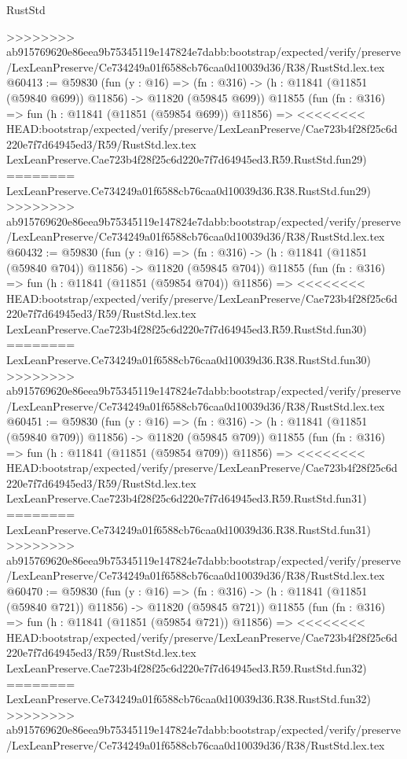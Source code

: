\begin{lexlean}{RustStd}
\begin{coremodule}
{\begin{coremodule}
{{{{{{{{{{{{{{{{{{{{{{{{{{{{{{{{{{{{{{{{{{{{{{{{{{>>>>>>>> ab915769620e86eea9b75345119e147824e7dabb:bootstrap/expected/verify/preserve/LexLeanPreserve/Ce734249a01f6588cb76caa0d10039d36/R38/RustStd.lex.tex
@60413 := @59830
    (fun (y : @16) =>
    (fn : @316) -> (h : @11841 (@11851 (@59840 @699)) @11856) -> @11820 (@59845 @699))
    @11855
    (fun (fn : @316) =>
    fun (h : @11841 (@11851 (@59854 @699)) @11856) =>
<<<<<<<< HEAD:bootstrap/expected/verify/preserve/LexLeanPreserve/Cae723b4f28f25c6d220e7f7d64945ed3/R59/RustStd.lex.tex
    LexLeanPreserve.Cae723b4f28f25c6d220e7f7d64945ed3.R59.RustStd.fun29)
========
    LexLeanPreserve.Ce734249a01f6588cb76caa0d10039d36.R38.RustStd.fun29)
>>>>>>>> ab915769620e86eea9b75345119e147824e7dabb:bootstrap/expected/verify/preserve/LexLeanPreserve/Ce734249a01f6588cb76caa0d10039d36/R38/RustStd.lex.tex
@60432 := @59830
    (fun (y : @16) =>
    (fn : @316) -> (h : @11841 (@11851 (@59840 @704)) @11856) -> @11820 (@59845 @704))
    @11855
    (fun (fn : @316) =>
    fun (h : @11841 (@11851 (@59854 @704)) @11856) =>
<<<<<<<< HEAD:bootstrap/expected/verify/preserve/LexLeanPreserve/Cae723b4f28f25c6d220e7f7d64945ed3/R59/RustStd.lex.tex
    LexLeanPreserve.Cae723b4f28f25c6d220e7f7d64945ed3.R59.RustStd.fun30)
========
    LexLeanPreserve.Ce734249a01f6588cb76caa0d10039d36.R38.RustStd.fun30)
>>>>>>>> ab915769620e86eea9b75345119e147824e7dabb:bootstrap/expected/verify/preserve/LexLeanPreserve/Ce734249a01f6588cb76caa0d10039d36/R38/RustStd.lex.tex
@60451 := @59830
    (fun (y : @16) =>
    (fn : @316) -> (h : @11841 (@11851 (@59840 @709)) @11856) -> @11820 (@59845 @709))
    @11855
    (fun (fn : @316) =>
    fun (h : @11841 (@11851 (@59854 @709)) @11856) =>
<<<<<<<< HEAD:bootstrap/expected/verify/preserve/LexLeanPreserve/Cae723b4f28f25c6d220e7f7d64945ed3/R59/RustStd.lex.tex
    LexLeanPreserve.Cae723b4f28f25c6d220e7f7d64945ed3.R59.RustStd.fun31)
========
    LexLeanPreserve.Ce734249a01f6588cb76caa0d10039d36.R38.RustStd.fun31)
>>>>>>>> ab915769620e86eea9b75345119e147824e7dabb:bootstrap/expected/verify/preserve/LexLeanPreserve/Ce734249a01f6588cb76caa0d10039d36/R38/RustStd.lex.tex
@60470 := @59830
    (fun (y : @16) =>
    (fn : @316) -> (h : @11841 (@11851 (@59840 @721)) @11856) -> @11820 (@59845 @721))
    @11855
    (fun (fn : @316) =>
    fun (h : @11841 (@11851 (@59854 @721)) @11856) =>
<<<<<<<< HEAD:bootstrap/expected/verify/preserve/LexLeanPreserve/Cae723b4f28f25c6d220e7f7d64945ed3/R59/RustStd.lex.tex
    LexLeanPreserve.Cae723b4f28f25c6d220e7f7d64945ed3.R59.RustStd.fun32)
========
    LexLeanPreserve.Ce734249a01f6588cb76caa0d10039d36.R38.RustStd.fun32)
>>>>>>>> ab915769620e86eea9b75345119e147824e7dabb:bootstrap/expected/verify/preserve/LexLeanPreserve/Ce734249a01f6588cb76caa0d10039d36/R38/RustStd.lex.tex
}}}}}}}}}}}}}}}}}}}}}}}}}}}}}}}}}}}}}}}}}}}}}}}}}}
\end{coremodule}}
\end{coremodule}
\end{lexlean}

